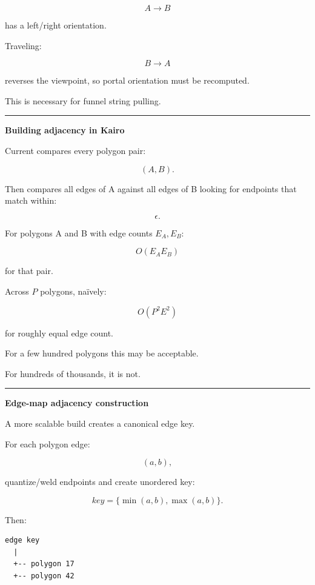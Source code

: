 \[
A\rightarrow B
\]

has a left/right orientation.

Traveling:

\[
B\rightarrow A
\]

reverses the viewpoint, so portal orientation must be recomputed.

This is necessary for funnel string pulling.

\begin{center}\rule{0.5\linewidth}{0.5pt}\end{center}

\textbf{Building adjacency in Kairo}

Current  compares every polygon pair:

\[
(A,B).
\]

Then  compares all edges of A against all edges of B looking for endpoints that match within:

\[
\epsilon.
\]

For polygons A and B with edge counts \(E_A,E_B\):

\[
O(E_AE_B)
\]

for that pair.

Across \(P\) polygons, naïvely:

\[
O(P^2E^2)
\]

for roughly equal edge count.

For a few hundred polygons this may be acceptable.

For hundreds of thousands, it is not.

\begin{center}\rule{0.5\linewidth}{0.5pt}\end{center}

\textbf{Edge-map adjacency construction}

A more scalable build creates a canonical edge key.

For each polygon edge:

\[
(a,b),
\]

quantize/weld endpoints and create unordered key:

\[
key=\{\min(a,b),\max(a,b)\}.
\]

Then:

\begin{verbatim}
edge key
  |
  +-- polygon 17
  +-- polygon 42
\end{verbatim}

